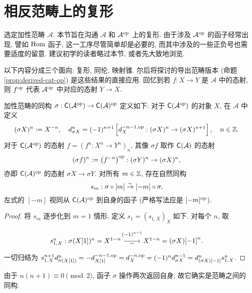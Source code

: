\section{相反范畴上的复形}\label{sec:opposite-cplx}
选定加性范畴 $\mathcal{A}$. 本节旨在沟通 $\mathcal{A}$ 和 $\mathcal{A}^{\operatorname{op}}$ 上的复形. 由于涉及 $\mathcal{A}^{\operatorname{op}}$ 的函子经常出现, 譬如 $\operatorname{Hom}$ 函子, 这一工序尽管简单却是必要的, 而其中涉及的一些正负号也需要适度的留意. 建议初学的读者略过本节, 或者先大致地浏览.

以下内容分成三个面向: 复形, 同伦, 映射锥. 尔后将探讨的导出范畴版本 (命题 \ref{prop:derived-cat-op}) 是这些结果的直接应用. 回忆到若 $f: X \to Y$ 是 $\mathcal{A}$ 中的态射, 则 $f^{\operatorname{op}}$ 代表 $\mathcal{A}^{\operatorname{op}}$ 中对应的态射 $Y \to X$.

\begin{definition-proposition}\label{def:sigma}
	加性范畴的同构 $\sigma: \mathsf{C}(\mathcal{A}^{\operatorname{op}}) \to \mathsf{C}(\mathcal{A})^{\operatorname{op}}$ 定义如下: 对于 $\mathsf{C}(\mathcal{A}^{\operatorname{op}})$ 的对象 $X$, 在 $\mathcal{A}$ 中定义
	\[ (\sigma X)^n := X^{-n}, \quad d_{\sigma X}^n = (-1)^{n+1} \left[ d_X^{-n-1, \operatorname{op}}: (\sigma X)^n \to (\sigma X)^{n+1} \right], \quad n \in \mathbb{Z}. \]
	对于 $\mathsf{C}(\mathcal{A}^{\operatorname{op}})$ 的态射 $f = \left( f^n: X^n \to Y^n \right)_n$, 其像 $\sigma f$ 取作 $\mathsf{C}(\mathcal{A})$ 的态射
	\[ (\sigma f)^n := \left(f^{-n} \right)^{\operatorname{op}} : (\sigma Y)^n \to (\sigma X)^n, \]
	亦即 $\mathsf{C}(\mathcal{A})^{\operatorname{op}}$ 的态射 $\sigma X \to \sigma Y$. 对所有 $m \in \mathbb{Z}$, 存在自然同构
	\[ s_m: \sigma \circ [m] \stackrel{\sim}{\rightarrow} [-m] \circ \sigma, \]
	左式的 $[-m]$ 视同从 $\mathsf{C}(\mathcal{A})^{\operatorname{op}}$ 到自身的函子 (严格写法应是 $[-m]^{\operatorname{op}}$).
\end{definition-proposition}
\begin{proof}
	将 $s_m$ 逐步化到 $m=1$ 情形. 定义 $s_1 = (s_{1, X})_X$ 如下. 对每个 $n$, 取
	\begin{equation}\label{eqn:sigma-s}\begin{tikzcd}[row sep=tiny]
		s_{1,X}^n : \sigma(X{[1]})^n = X^{1-n} \arrow[r, "\sim"', "{(-1)^{n-1}}" inner sep=0.6em] & X^{1-n} = (\sigma X){[-1]}^n .
	\end{tikzcd}\end{equation}
	一切归结为 $s_{1, X}^{n+1} d^n_{\sigma(X[1])} = -d_{X[1]}^{-n-1, \operatorname{op}} = d_X^{-n, \operatorname{op}} = (-1)^n d_{\sigma X}^{n-1} = d^n_{(\sigma X)[-1]} s_{1,X}^n$.
\end{proof}

由于 $n(n+1) \equiv 0 \pmod{2}$, 函子 $\sigma$ 操作两次返回自身, 故它确实是范畴之间的同构.

